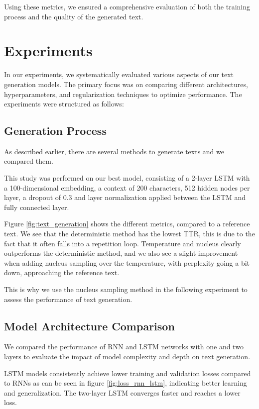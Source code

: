\documentclass{article}
\begin{document}
Using these metrics, we ensured a comprehensive evaluation of both the training process and the quality of the generated text.


\section{Experiments}

In our experiments, we systematically evaluated various aspects of our text generation models. The primary focus was on comparing different architectures, hyperparameters, and regularization techniques to optimize performance. The experiments were structured as follows:

\subsection{Generation Process}\label{Generation study}

As described earlier, there are several methods to generate texts and we compared them. 

This study was performed on our best model, consisting of a 2-layer LSTM with a 100-dimensional embedding, a context of 200 characters, 512 hidden nodes per layer, a dropout of 0.3 and layer normalization applied between the LSTM and fully connected layer.

Figure \ref{fig:text_generation} shows the different metrics, compared to a reference text.
We see that the deterministic method has the lowest TTR, this is due to the fact that it often falls into a repetition loop. Temperature and nucleus clearly outperforms the deterministic method, and we also see a slight improvement when adding nucleus sampling over the temperature, with perplexity going a bit down, approaching the reference text.   

This is why we use the nucleus sampling method in the following experiment to assess the performance of text generation.

\subsection{Model Architecture Comparison}

We compared the performance of RNN and LSTM networks with one and two layers to evaluate the impact of model complexity and depth on text generation.

LSTM models consistently achieve lower training and validation losses compared to RNNs as can be seen in figure \ref{fig:loss_rnn_lstm}, indicating better learning and generalization. The two-layer LSTM converges faster and reaches a lower loss.
\end{document}
